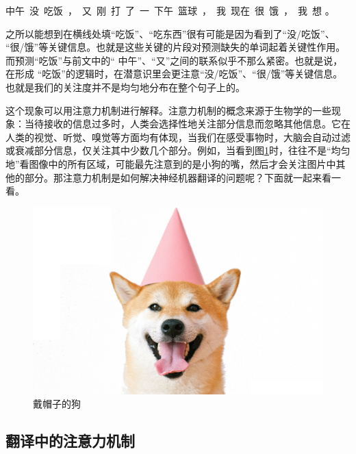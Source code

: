\vspace{0.8em}
\centerline{中午\ 没\ 吃饭\ ，\ 又\ 刚\ 打\ 了\ 一\ 下午\ 篮球\ ，\ 我\ 现在\ 很\ 饿\ ，\ 我\ 想\underline{\quad \quad \quad} 。}
\vspace{0.8em}

\noindent 之所以能想到在横线处填“吃饭”、“吃东西”很有可能是因为看到了“没/吃饭”、 “很/饿”等关键信息。也就是这些关键的片段对预测缺失的单词起着关键性作用。而预测“吃饭”与前文中的“ 中午”、“又”之间的联系似乎不那么紧密。也就是说，在形成 “吃饭”的逻辑时，在潜意识里会更注意“没/吃饭”、“很/饿”等关键信息。也就是我们的关注度并不是均匀地分布在整个句子上的。

\parinterval 这个现象可以用注意力机制进行解释。注意力机制的概念来源于生物学的一些现象：当待接收的信息过多时，人类会选择性地关注部分信息而忽略其他信息。它在人类的视觉、听觉、嗅觉等方面均有体现，当我们在感受事物时，大脑会自动过滤或衰减部分信息，仅关注其中少数几个部分。例如，当看到图\ref{fig:10-16}时，往往不是“均匀地”看图像中的所有区域，可能最先注意到的是小狗的嘴，然后才会关注图片中其他的部分。那注意力机制是如何解决神经机器翻译的问题呢？下面就一起来看一看。

\begin{figure}[htp]
\centering
\includegraphics[scale=0.05]{./Chapter10/Figures/dog-hat-new.jpg}
\caption{戴帽子的狗}
\label{fig:10-16}
\end{figure}

\subsection{翻译中的注意力机制}

